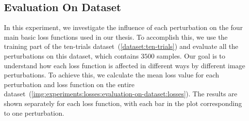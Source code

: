 

\subsection{Evaluation On Dataset}
\label{experiments:losses:evaluation-on-dataset}
In this experiment, we investigate the influence of each perturbation on the four main basic loss functions used in our thesis. To accomplish this, we use the training part of the ten-trials dataset~(\ref{dataset:ten-trials}) and evaluate all the perturbations on this dataset, which contains $3500$ samples. 
Our goal is to understand how each loss function is affected in different ways by different image perturbations. To achieve this, we calculate the mean loss value for each perturbation and loss function on the entire dataset~(\ref{img:experiments:losses:evaluation-on-dataset:losses}). The results are shown separately for each loss function, with each bar in the plot corresponding to one perturbation.

